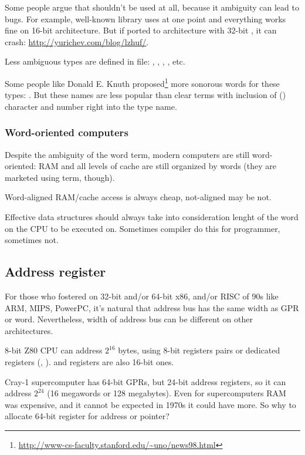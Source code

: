 Some people argue that  shouldn't be used at all, because it ambiguity can lead to bugs.
For example, well-known  library uses  at one point and everything works fine on 16-bit architecture.
But if ported to architecture with 32-bit , it can crash: \url{http://yurichev.com/blog/lzhuf/}.

Less ambiguous types are defined in  file:
, , , , etc.

Some people like Donald E. Knuth proposed\footnote{\url{http://www-cs-faculty.stanford.edu/~uno/news98.html}}
more sonorous words
for these types: .
But these names are less popular than clear terms with inclusion of  () character 
and number right into the type name.

\subsubsection{Word-oriented computers}

Despite the ambiguity of the \gls{word} term, modern computers are still word-oriented: \ac{RAM} and all levels of cache
are still organized by words (they are marketed using  term, though).

Word-aligned RAM/cache access is always cheap, not-aligned may be not.

Effective data structures should always take into consideration lenght of the \gls{word} on the CPU to be executed on.
Sometimes compiler do this for programmer, sometimes not.

\subsection{Address register}

For those who fostered on 32-bit and/or 64-bit x86, and/or RISC of 90s like ARM, MIPS, PowerPC, it's natural that
address bus has the same width as \ac{GPR} or \gls{word}.
Nevertheless, width of address bus can be different on other architectures.

8-bit Z80 CPU can address $2^{16}$ bytes, using 8-bit registers pairs or dedicated registers (, ).
 and  registers are also 16-bit ones.

Cray-1 supercomputer has 64-bit GPRs, but 24-bit address registers, so it can address $2^{24}$ 
(16 megawords or 128 megabytes).
Even for supercomputers RAM was expensive, and it cannot be expected in 1970s it could have more.
So why to allocate 64-bit register for address or pointer?

